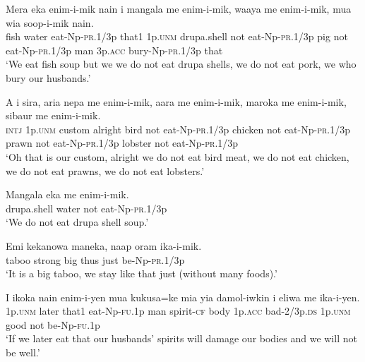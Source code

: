 \ea\label{ex:a:x20}
\gll  Mera  eka  enim-i-mik  nain  i  mangala  me  enim-i-mik,               waaya  me  enim-i-mik,  mua  wia  soop-i-mik  nain. \\
fish  water  eat-Np-\textsc{pr}.1/3p  that1  1p.\textsc{unm}  drupa.shell  not  eat-Np-\textsc{pr}.1/3p pig  not  eat-Np-\textsc{pr}.1/3p  man  3p.\textsc{acc}  bury-Np-\textsc{pr}.1/3p  that \\


\glt ‘We eat fish soup but we we do not eat drupa shells, we do not eat pork, we who bury our husbands.’ \\
\z


\ea\label{ex:a:x21}
\gll  A  i  sira,  aria  nepa  me  enim-i-mik,  aara              me  enim-i-mik,  maroka  me  enim-i-mik,  sibaur         me  enim-i-mik. \\
\textsc{intj}  1p.\textsc{unm}  custom  alright  bird  not  eat-Np-\textsc{pr}.1/3p  chicken not  eat-Np-\textsc{pr}.1/3p  prawn  not  eat-Np-\textsc{pr}.1/3p  lobster not  eat-Np-\textsc{pr}.1/3p \\




\glt ‘Oh that is our custom, alright we do not eat bird meat, we do not eat chicken, we do not eat prawns, we do not eat lobsters.’ \\
\z


\ea\label{ex:a:x22}
\gll  Mangala  eka  me  enim-i-mik. \\
drupa.shell  water  not  eat-Np-\textsc{pr}.1/3p \\
\glt ‘We do not eat drupa shell soup.’ \\
\z


\ea\label{ex:a:x23}
\gll  Emi  kekanowa  maneka,  naap  oram  ika-i-mik. \\
taboo  strong  big  thus  just  be-Np-\textsc{pr}.1/3p \\
\glt ‘It is a big taboo, we stay like that just (without many foods).’ \\
\z


\ea\label{ex:a:x24}
\gll  I  ikoka  nain  enim-i-yen  mua  kukusa=ke  mia  yia       damol-iwkin  i  eliwa  me  ika-i-yen. \\
1p.\textsc{unm}  later  that1  eat-Np-\textsc{fu}.1p  man  spirit-\textsc{cf}  body  1p.\textsc{acc} bad-2/3p.\textsc{ds}  1p.\textsc{unm}  good  not  be-Np-\textsc{fu}.1p \\


\glt ‘If we later eat that our husbands’ spirits will damage our bodies and we will not be well.’ \\
\z


